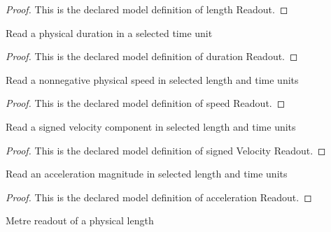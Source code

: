 \begin{proof}
  This is the declared model definition of length Readout.
\end{proof}
\begin{definition}
  \label{def:physics:phyx-mini-0753:phyxminiproblems-problemphyxmini0753-durationreadout}
  Read a physical duration in a selected time unit
\end{definition}
\begin{proof}
  This is the declared model definition of duration Readout.
\end{proof}
\begin{definition}
  \label{def:physics:phyx-mini-0753:phyxminiproblems-problemphyxmini0753-speedreadout}
  Read a nonnegative physical speed in selected length and time units
\end{definition}
\begin{proof}
  This is the declared model definition of speed Readout.
\end{proof}
\begin{definition}
  \label{def:physics:phyx-mini-0753:phyxminiproblems-problemphyxmini0753-signedvelocityreadout}
  Read a signed velocity component in selected length and time units
\end{definition}
\begin{proof}
  This is the declared model definition of signed Velocity Readout.
\end{proof}
\begin{definition}
  \label{def:physics:phyx-mini-0753:phyxminiproblems-problemphyxmini0753-accelerationreadout}
  Read an acceleration magnitude in selected length and time units
\end{definition}
\begin{proof}
  This is the declared model definition of acceleration Readout.
\end{proof}
\begin{definition}
  \label{def:physics:phyx-mini-0753:phyxminiproblems-problemphyxmini0753-lengthinmetres}
  Metre readout of a physical length
\end{definition}
